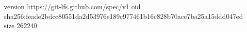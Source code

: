 version https://git-lfs.github.com/spec/v1
oid sha256:feade2bdcc80551da2d53976e189c977461b16c828b70ace7ba25a15ddd047ed
size 262240

